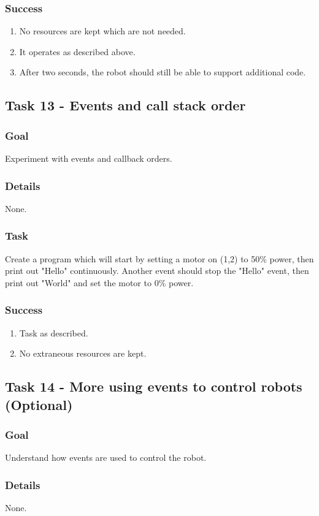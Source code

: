 \documentclass[a4paper]{article}
\begin{document}
\subsubsection{Success} \begin{enumerate}\item{No resources are kept which are not needed.}\item{It operates as described above.}\item{After two seconds, the robot should still be able to support additional code.}\end{enumerate}

\subsection{Task 13 - Events and call stack order}
\subsubsection{Goal} Experiment with events and callback orders.
\subsubsection{Details} None.
\subsubsection{Task} Create a program which will start by setting a motor on (1,2) to 50\% power, then print out "Hello" continuously. Another event should stop the "Hello" event, then print out "World" and set the motor to 0\% power.
\subsubsection{Success} \begin{enumerate}\item{Task as described.}\item{No extraneous resources are kept.}\end{enumerate}

\subsection{Task 14 - More using events to control robots (Optional)}
\subsubsection{Goal} Understand how events are used to control the robot.
\subsubsection{Details} None.
\end{document}
